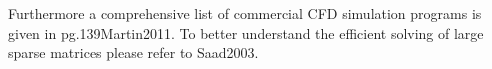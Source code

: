 Furthermore a comprehensive list of commercial CFD simulation programs is given in pg.139Martin2011. To better understand the efficient solving of large sparse matrices please refer to Saad2003.




 
